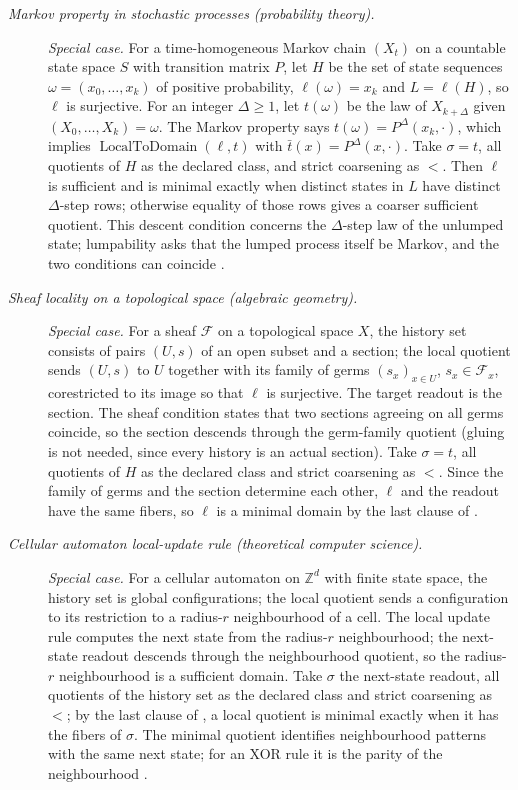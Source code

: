 \begingroup\small
\begin{description}
\item[\emph{Markov property in stochastic processes
(probability theory).}] \textit{Special case.}
For a time-homogeneous Markov chain \((X_t)\) on a countable
state space \(S\) with transition matrix \(P\), let \(H\) be the set of
state sequences \(\omega=(x_0,\dots,x_k)\) of positive probability,
\(\ell(\omega)=x_k\) and \(L=\ell(H)\), so \(\ell\) is surjective. For an
integer \(\Delta\ge1\), let \(t(\omega)\) be the law of \(X_{k+\Delta}\) given
\((X_0,\dots,X_k)=\omega\). The Markov property says
\(t(\omega)=P^{\Delta}(x_k,\cdot)\), which implies
\(\operatorname{LocalToDomain}(\ell,t)\) with \(\bar t(x)=P^{\Delta}(x,\cdot)\). Take \(\sigma=t\), all quotients of \(H\)
as the declared class, and strict coarsening as \(<\). Then \(\ell\)
is sufficient and is minimal exactly when distinct states in \(L\)
have distinct \(\Delta\)-step rows; otherwise equality of those rows
gives a coarser sufficient quotient. This descent condition concerns the \(\Delta\)-step law of the unlumped state; lumpability asks that the lumped process itself be Markov, and the two conditions can coincide \citep{Markov1906Investigation}.

\item[\emph{Sheaf locality on a topological space
(algebraic geometry).}] \textit{Special case.}
For a sheaf \(\mathcal F\) on a topological space
\(X\), the history set consists of pairs
\((U,s)\) of an open subset and a section; the
local quotient sends \((U,s)\) to \(U\) together with its family of
germs \((s_x)_{x\in U}\), \(s_x\in\mathcal F_x\), corestricted to its image so that \(\ell\) is surjective.  The target
readout is the section.  The sheaf condition
states that two sections agreeing on all germs
coincide, so the section descends through the germ-family quotient (gluing is not needed, since every history is an actual section).  Take \(\sigma=t\), all quotients of \(H\) as
the declared class and strict coarsening as \(<\). Since the family of
germs and the section determine each other, \(\ell\) and the readout have
the same fibers, so \(\ell\) is a minimal domain by the last clause of
 \citep{Grothendieck1957Tohoku}.

\item[\emph{Cellular automaton local-update rule
(theoretical computer science).}] \textit{Special case.}
For a cellular automaton on \(\mathbb Z^d\) with
finite state space, the history set is global
configurations; the local quotient sends a
configuration to its restriction to a radius-\(r\)
neighbourhood of a cell.  The local update rule
computes the next state from the radius-\(r\)
neighbourhood; the next-state readout descends
through the neighbourhood quotient, so the
radius-\(r\) neighbourhood is a sufficient domain.
Take \(\sigma\) the next-state readout, all quotients of the history set as the declared class and strict coarsening as \(<\); by the last clause of , a local quotient is minimal exactly when it has the fibers of \(\sigma\). The minimal quotient identifies neighbourhood
patterns with the same next state; for an XOR rule it
is the parity of the neighbourhood
\citep{vonNeumann1966SelfReproducing}.


\end{description}
